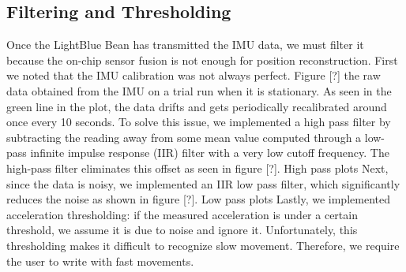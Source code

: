 \documentclass[12pt,journal]{IEEEtran}
\begin{document}
\subsection{Filtering and Thresholding}
	Once the LightBlue Bean has transmitted the IMU data, we must filter it because the on-chip sensor fusion is not enough for position reconstruction. First we noted that the IMU calibration was not always perfect. Figure [?] the raw data obtained from the IMU on a trial run when it is stationary. As seen in the green line in the plot, the data drifts and gets periodically recalibrated around once every 10 seconds. To solve this issue, we implemented a high pass filter by subtracting the reading away from some mean value computed through a low-pass infinite impulse response (IIR) filter with a very low cutoff frequency. The high-pass filter eliminates this offset as seen in figure [?].
High pass plots
	Next, since the data is noisy, we implemented an IIR low pass filter, which significantly reduces the noise as shown in figure [?].
Low pass plots
Lastly, we implemented acceleration thresholding: if the measured acceleration is under a certain threshold, we assume it is due to noise and ignore it. Unfortunately, this thresholding makes it difficult to recognize slow movement. Therefore, we require the user to write with fast movements. 
\end{document}
